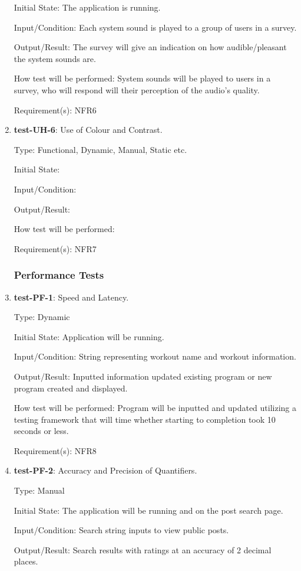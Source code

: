 \documentclass[12pt, titlepage]{article}
\begin{document}
\begin{enumerate}
		Initial State: The application is running.
		
		Input/Condition: Each system sound is played to a group of users in a survey.
		
		Output/Result: The survey will give an indication on how audible/pleasant the system sounds are.
		
		How test will be performed: System sounds will be played to users in a survey, who will respond will their perception of the audio's quality.
		
		Requirement(s): NFR6
		
		\item{\textbf{test-UH-6}}: Use of Colour and Contrast.
		
		Type: Functional, Dynamic, Manual, Static etc.
		
		Initial State: 
		
		Input/Condition: 
		
		Output/Result: 
		
		How test will be performed: 
		
		Requirement(s): NFR7
	\subsubsection{Performance Tests}
		\item{\textbf{test-PF-1}}: Speed and Latency.
		
		Type: Dynamic
		
		Initial State: Application will be running.
		
		Input/Condition: String representing workout name and workout information.
		
		Output/Result: Inputted information updated existing program or new program created and displayed.
		
		How test will be performed: Program will be inputted and updated utilizing a testing framework that will time whether starting to completion took 10 seconds or less. 
		
		Requirement(s): NFR8
		
		\item{\textbf{test-PF-2}}: Accuracy and Precision of Quantifiers.
		
		Type: Manual
		
		Initial State: The application will be running and on the post search page.
		
		Input/Condition: Search string inputs to view public posts.
		
		Output/Result: Search results with ratings at an accuracy of 2 decimal places.
		

\end{enumerate}
\end{document}
